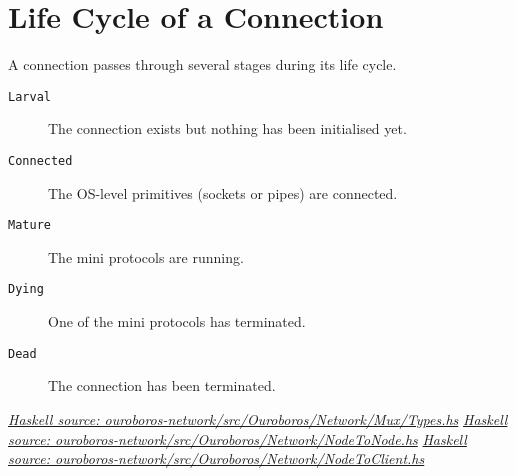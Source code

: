 \documentclass{report}
\newcommand{\hsref}[1]{\href{https://github.com/input-output-hk/ouroboros-network/blob/master/#1}{\emph{Haskell source: #1}}}
\newcommand{\state}[1]{\texttt{#1}}
\newcommand{\msg}[1]{\texttt{#1}}
\theoremstyle{definition}{
  \newtheorem{lemma}{Lemma}[section] %
  \newtheorem{definition}[lemma]{Definition}
}
\theoremstyle{theorem}{
  \newtheorem{invariant}[lemma]{Invariant}
  \newtheorem{proofobligation}[lemma]{Proof Obligation}
}
\numberwithin{equation}{lemma}
\begin{document}
\newcommand{\Larval}{\state{Larval}}
\newcommand{\Connected}{\state{Connected}}
\newcommand{\Mature}{\state{Mature}}
\newcommand{\Dying}{\state{Dying}}
\newcommand{\Dead}{\state{Dead}}

\section{Life Cycle of a Connection}

A connection passes through several stages during its life cycle.
\begin{description}
\item[\Larval]    The connection exists but nothing has been initialised yet.
\item[\Connected] The OS-level primitives (sockets or pipes) are connected.
\item[\Mature] The mini protocols are running.
\item[\Dying]  One of the mini protocols has terminated.
\item[\Dead] The connection has been terminated.
\end{description}

\newcommand{\InitReq}{\msg{InitReq}}
\newcommand{\InitRsp}{\msg{InitRsp}}
\newcommand{\InitFail}{\msg{InitFail}}

\noindent\hsref{ouroboros-network/src/Ouroboros/Network/Mux/Types.hs}
\newline\hsref{ouroboros-network/src/Ouroboros/Network/NodeToNode.hs}
\newline\hsref{ouroboros-network/src/Ouroboros/Network/NodeToClient.hs}
\end{document}
